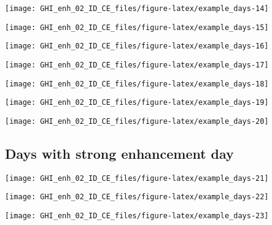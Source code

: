 \documentclass[
  10pt,
  a4paper,oneside]{article}
\begin{document}
\begin{center}\texttt{[image: GHI\_enh\_02\_ID\_CE\_files/figure-latex/example\_days-14]} \end{center}

\begin{center}\texttt{[image: GHI\_enh\_02\_ID\_CE\_files/figure-latex/example\_days-15]} \end{center}

\begin{center}\texttt{[image: GHI\_enh\_02\_ID\_CE\_files/figure-latex/example\_days-16]} \end{center}

\begin{center}\texttt{[image: GHI\_enh\_02\_ID\_CE\_files/figure-latex/example\_days-17]} \end{center}

\begin{center}\texttt{[image: GHI\_enh\_02\_ID\_CE\_files/figure-latex/example\_days-18]} \end{center}

\begin{center}\texttt{[image: GHI\_enh\_02\_ID\_CE\_files/figure-latex/example\_days-19]} \end{center}

\begin{center}\texttt{[image: GHI\_enh\_02\_ID\_CE\_files/figure-latex/example\_days-20]} \end{center}

\FloatBarrier

\hypertarget{days-with-strong-enhancement-day}{%
\subsection{Days with strong enhancement day}\label{days-with-strong-enhancement-day}}

\begin{center}\texttt{[image: GHI\_enh\_02\_ID\_CE\_files/figure-latex/example\_days-21]} \end{center}

\begin{center}\texttt{[image: GHI\_enh\_02\_ID\_CE\_files/figure-latex/example\_days-22]} \end{center}

\begin{center}\texttt{[image: GHI\_enh\_02\_ID\_CE\_files/figure-latex/example\_days-23]} \end{center}
\end{document}
